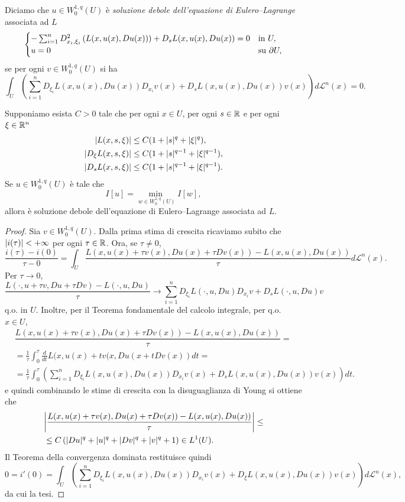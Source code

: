 \begin{definizione}
	Diciamo che $u \in W^{1,q}_0(U)$ è \emph{soluzione debole dell'equazione di Eulero--Lagrange} associata ad $L$ 
	\[ \begin{cases}
		-\sum_{i=1}^n D^2_{x_i,\xi_i}\left( L(x,u(x),Du(x))\right)  + D_{s}L(x,u(x),Du(x)) = 0 & \textup{in } U,\\
		u = 0 & \textup{su } \partial U,
	\end{cases} \]
	se per ogni $v \in W^{1,q}_0(U)$ si ha
	\[ \int_U \left( \sum_{i=1}^n D_{\xi_i} L(x,u(x),Du(x)) D_{x_i}v(x) + D_sL(x,u(x),Du(x)) v(x) \right) d\mathcal{L}^n(x) = 0. \]
\end{definizione}
\begin{teorema}
	Supponiamo esista $C>0$ tale che per ogni $x \in U$, per ogni $s \in \mathbb{R}$ e per ogni $\xi \in \mathbb{R}^n$ 
	\begin{align*}
		\lvert L(x,s,\xi)\rvert &\le C (1+ \lvert s\rvert^q+\lvert\xi\rvert^q), \\
		\lvert D_\xi L(x,s,\xi)\rvert &\le C (1+ \lvert s\rvert^{q-1}+\lvert\xi\rvert^{q-1}), \\
		\lvert D_s L(x,s,\xi)\rvert &\le C (1+ \lvert s\rvert^{q-1}+\lvert\xi\rvert^{q-1}).
	\end{align*} 
	Se $u \in W^{1,q}_0(U)$ è tale che 
	\[ I[u] = \underset{w \in W^{1,q}_0(U)}{\min \;}I[w], \]
	allora è soluzione debole dell'equazione di Eulero--Lagrange associata ad $L$.
\end{teorema}
\begin{proof}
	Sia $v \in W^{1,q}_0(U)$. Dalla prima stima di crescita ricaviamo subito che $\lvert i(\tau)\rvert < +\infty$ per ogni $\tau \in \mathbb{R}$. Ora, se $\tau \ne 0$, 
	\[ \dfrac{i(\tau)-i(0)}{\tau - 0} = \int_U \dfrac{L(x,u(x)+\tau v(x),Du(x)+\tau Dv(x)) - L(x,u(x),Du(x))}{\tau} d\mathcal{L}^n(x). \]
	Per $\tau \to 0$,
	\[  \dfrac{L(\cdot,u+\tau v,Du+\tau Dv) - L(\cdot,u,Du)}{\tau} \to \sum_{i=1}^n D_{\xi_i}L(\cdot,u,Du)D_{x_i}v + D_s L(\cdot,u,Du)v \]
	q.o. in $U$. Inoltre, per il Teorema fondamentale del calcolo integrale, per q.o. $x \in U$,
	\begin{align*}
		&\dfrac{L(x,u(x)+\tau v(x),Du(x)+\tau Dv(x)) - L(x,u(x),Du(x))}{\tau} = \\ &=\frac{1}{\tau}\int_{0}^{\tau} \frac{d}{dt} L(x,u(x)+tv(x,Du(x+tDv(x))dt = \\
		&= \frac{1}{\tau} \int_{0}^\tau\left( \sum_{i=1}^n D_{\xi_i}L(x,u(x),Du(x))D_{x_i}v(x) + D_s L(x,u(x),Du(x))v(x)\right) d t .
	\end{align*}
	e quindi combinando le stime di crescita con la disuguaglianza di Young si ottiene che 
	\begin{align*}
		&\abs*{\dfrac{L(x,u(x)+\tau v(x),Du(x)+\tau Dv(x)) - L(x,u(x),Du(x))}{\tau}} \le \\
		& \le C\left( \abs{Du}^q +\abs{u}^q + \abs{Dv}^q +\abs{v}^q + 1\right)  \in L^1(U).
	\end{align*}
	Il Teorema della convergenza dominata restituisce quindi
	\[ 0 = i'(0) = \int_{U}\left( \sum_{i=1}^n D_{\xi_i}L(x,u(x),Du(x))D_{x_i}v(x) + D_\xi L(x,u(x),Du(x))v(x)\right)d\mathcal{L}^n(x),  \]
	da cui la tesi.
\end{proof}
